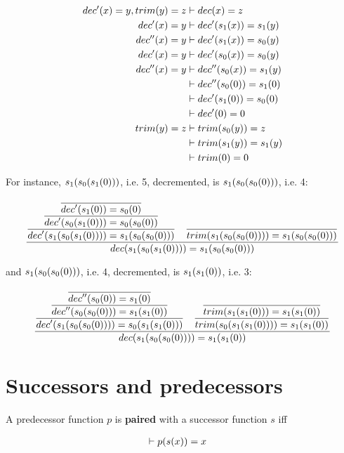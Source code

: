 \begin{align}
dec'\p{x}=y, trim\p{y}=z &\vdash dec\p{x} = z \\
dec'\p{x} = y &\vdash dec'\p{s_1\p{x}} = s_1\p{y} \\
dec''\p{x} = y &\vdash dec'\p{s_1\p{x}} = s_0\p{y} \\
dec'\p{x} = y &\vdash dec'\p{s_0\p{x}} = s_0\p{y} \\
dec''\p{x} = y &\vdash dec''\p{s_0\p{x}} = s_1\p{y} \\
&\vdash dec''\p{s_0\p{0}} = s_1\p{0} \\
&\vdash dec'\p{s_1\p{0}} = s_0\p{0} \\
&\vdash dec'\p{0} = 0 \\
trim\p{y} = z &\vdash trim\p{s_0\p{y}} = z \\
&\vdash trim\p{s_1\p{y}} = s_1\p{y} \\
&\vdash trim\p{0} = 0
\end{align}

For instance, $s_1\p{s_0\p{s_1\p{0}}}$, i.e. 5, decremented, is
$s_1\p{s_0\p{s_0\p{0}}}$, i.e. 4:

$$
\judgement{
  \judgement{
    \judgement{
      \axiom{
        dec'\p{s_1\p{0}} = s_0\p{0}
      }
    }{
      dec'\p{s_0\p{s_1\p{0}}} = s_0\p{s_0\p{0}}
    }
  }{
    dec'\p{s_1\p{s_0\p{s_1\p{0}}}} = s_1\p{s_0\p{s_0\p{0}}}
  }
  \quad
  \axiom{
    trim\p{s_1\p{s_0\p{s_0\p{0}}}} = s_1\p{s_0\p{s_0\p{0}}}
  }
}{
  dec\p{s_1\p{s_0\p{s_1\p{0}}}} = s_1\p{s_0\p{s_0\p{0}}}
}
$$

and $s_1\p{s_0\p{s_0\p{0}}}$, i.e. 4, decremented, is $s_1\p{s_1\p{0}}$, i.e. $3$:

$$
\judgement{
  \judgement{
    \judgement{
      \axiom{
        dec''\p{s_0\p{0}} = s_1\p{0}
      }
    }{
      dec''\p{s_0\p{s_0\p{0}}} = s_1\p{s_1\p{0}}
    }
  }{
    dec'\p{s_1\p{s_0\p{s_0\p{0}}}} = s_0\p{s_1\p{s_1\p{0}}}
  }
  \quad
  \judgement{
    \axiom{
      trim\p{s_1\p{s_1\p{0}}} = s_1\p{s_1\p{0}}
    }
  }{
    trim\p{s_0\p{s_1\p{s_1\p{0}}}} = s_1\p{s_1\p{0}}
  }
}{
  dec\p{s_1\p{s_0\p{s_0\p{0}}}} = s_1\p{s_1\p{0}}
}
$$

\section{Successors and predecessors}

\begin{definition}

A predecessor function $p$ is \textbf{paired} with a successor function $s$ iff

\begin{align}
\vdash p\p{s\p{x}} &= x
\end{align}

\end{definition}

